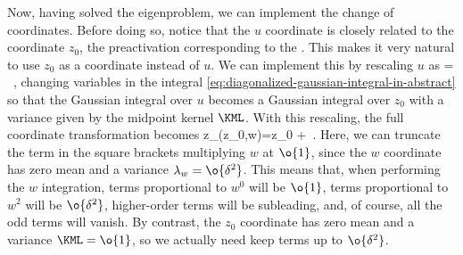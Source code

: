Now, having solved the eigenproblem, we can implement the change of coordinates. Before doing so, notice that the $u$ coordinate is closely related to the coordinate $z_0$, the preactivation corresponding to the . This makes it very natural to use $z_0$ as a coordinate instead of $u$.  We can implement this by rescaling $u$ as
\be
{}= \, ,
\ee
changing variables in the integral \eqref{eq:diagonalized-gaussian-integral-in-abstract}
so that the Gaussian integral over $u$ becomes a Gaussian integral over $z_0$ with a variance given by the midpoint kernel $\KML$. With this rescaling, the full coordinate transformation becomes
\be\label{eq:new-coordinate-transformation}
z_{\pm}(z_0,w)=z_0 \! +\le[\pm 1 +\o{\delta} \ri]\, .
\ee
Here, we can truncate the term in the square brackets multiplying $w$ at $\o{1}$, since the $w$ coordinate has zero mean and a variance $\lambda_w = \o{\delta^2}$. This means that, when performing the $w$ integration, terms proportional to $w^0$ will be $\o{1}$, terms proportional to $w^2$ will be $\o{\delta^2}$, higher-order terms will be subleading, and, of course, all the odd terms will vanish.
By contrast, the $z_0$ coordinate has zero mean and a variance $\KML=\o{1}$,
so we actually need keep terms up to $\o{\delta^2}$.

